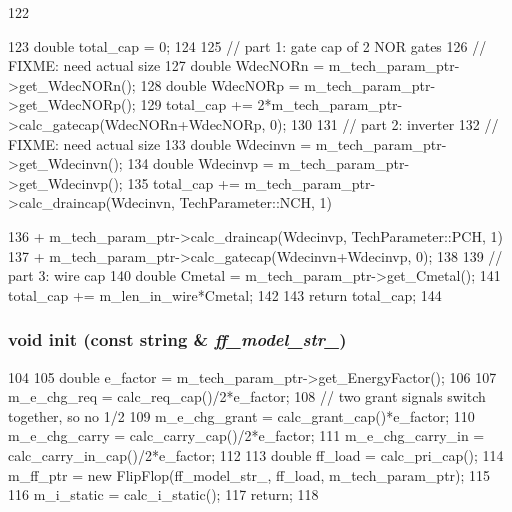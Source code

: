 \begin{DoxyCode}
122 {
123     double total_cap = 0;
124 
125     // part 1: gate cap of 2 NOR gates
126     // FIXME: need actual size
127     double WdecNORn = m_tech_param_ptr->get_WdecNORn();
128     double WdecNORp = m_tech_param_ptr->get_WdecNORp();
129     total_cap += 2*m_tech_param_ptr->calc_gatecap(WdecNORn+WdecNORp, 0);
130 
131     // part 2: inverter
132     // FIXME: need actual size
133     double Wdecinvn = m_tech_param_ptr->get_Wdecinvn();
134     double Wdecinvp = m_tech_param_ptr->get_Wdecinvp();
135     total_cap += m_tech_param_ptr->calc_draincap(Wdecinvn, TechParameter::NCH, 1)
      
136         + m_tech_param_ptr->calc_draincap(Wdecinvp, TechParameter::PCH, 1)
137         + m_tech_param_ptr->calc_gatecap(Wdecinvn+Wdecinvp, 0);
138 
139     // part 3: wire cap
140     double Cmetal = m_tech_param_ptr->get_Cmetal();
141     total_cap += m_len_in_wire*Cmetal;
142 
143     return total_cap;
144 }
\end{DoxyCode}
\hypertarget{classRRArbiter_aa30ab0383b17214d69595df443fe4223}{
\subsubsection[{init}]{\setlength{\rightskip}{0pt plus 5cm}void init (const string \& {\em ff\_\-model\_\-str\_\-})}}
\label{classRRArbiter_aa30ab0383b17214d69595df443fe4223}



\begin{DoxyCode}
104 {
105     double e_factor = m_tech_param_ptr->get_EnergyFactor();
106 
107     m_e_chg_req = calc_req_cap()/2*e_factor;
108     // two grant signals switch together, so no 1/2
109     m_e_chg_grant = calc_grant_cap()*e_factor;
110     m_e_chg_carry = calc_carry_cap()/2*e_factor;
111     m_e_chg_carry_in = calc_carry_in_cap()/2*e_factor;
112 
113     double ff_load = calc_pri_cap();
114     m_ff_ptr = new FlipFlop(ff_model_str_, ff_load, m_tech_param_ptr);
115 
116     m_i_static = calc_i_static();
117     return;
118 }
\end{DoxyCode}


